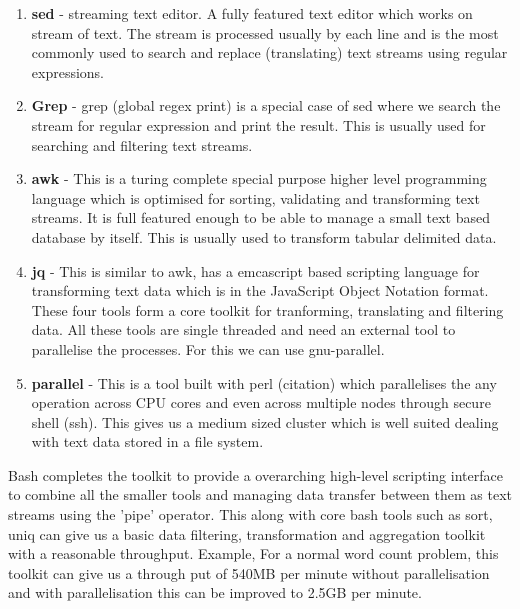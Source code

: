 \begin{enumerate}

\item \textbf{sed} - streaming text editor.
A fully featured text editor which works on  stream of text.
The stream is processed usually by each line and is the most  commonly used to search and replace (translating) text streams using regular  expressions.

\item \textbf{Grep} - grep (global regex print) is a special case of sed where we search  the stream for regular expression and print the result.
This is usually used  for searching and filtering text streams.


\item \textbf{awk} - This is a turing complete special purpose higher level programming  language which is optimised for sorting, validating and transforming text  streams.
It is full featured enough to be able to manage a small text based  database by itself.
This is usually used to transform tabular delimited data.

\item \textbf{jq} - This is similar to awk, has a emcascript based scripting language  for transforming text data which is in the JavaScript Object Notation format.
 These four tools form a core toolkit for tranforming, translating and  filtering data.
All these tools are single threaded and need an external tool  to parallelise the processes.
For this we can use gnu-parallel.

\item \textbf{parallel} - This is a tool built with perl (citation) which parallelises  the any operation across CPU cores and even across multiple nodes through  secure shell (ssh).
This gives us a medium sized cluster which is well suited  dealing with text data stored in a file system.

\end{enumerate}

Bash completes the toolkit to provide a overarching high-level scripting interface to combine all the smaller tools and managing data transfer between them as text streams using the 'pipe' operator.
This along with core bash tools such as sort, uniq can give us a basic data filtering, transformation and aggregation toolkit with a reasonable throughput.
Example, For a normal word count problem, this toolkit can give us a through put of 540MB per minute without parallelisation and with parallelisation this can be improved to 2.5GB per minute.


